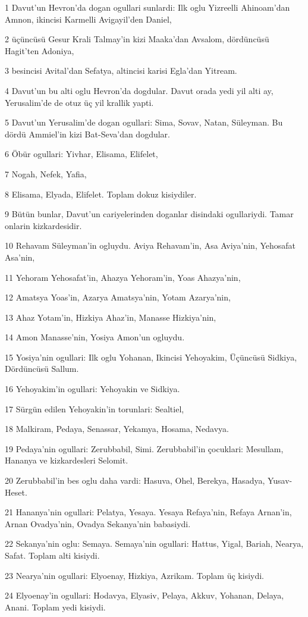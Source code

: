 \par 1 Davut'un Hevron'da dogan ogullari sunlardi: Ilk oglu Yizreelli Ahinoam'dan Amnon, ikincisi Karmelli Avigayil'den Daniel,
\par 2 üçüncüsü Gesur Krali Talmay'in kizi Maaka'dan Avsalom, dördüncüsü Hagit'ten Adoniya,
\par 3 besincisi Avital'dan Sefatya, altincisi karisi Egla'dan Yitream.
\par 4 Davut'un bu alti oglu Hevron'da dogdular. Davut orada yedi yil alti ay, Yerusalim'de de otuz üç yil krallik yapti.
\par 5 Davut'un Yerusalim'de dogan ogullari: Sima, Sovav, Natan, Süleyman. Bu dördü Ammiel'in kizi Bat-Seva'dan dogdular.
\par 6 Öbür ogullari: Yivhar, Elisama, Elifelet,
\par 7 Nogah, Nefek, Yafia,
\par 8 Elisama, Elyada, Elifelet. Toplam dokuz kisiydiler.
\par 9 Bütün bunlar, Davut'un cariyelerinden doganlar disindaki ogullariydi. Tamar onlarin kizkardesidir.
\par 10 Rehavam Süleyman'in ogluydu. Aviya Rehavam'in, Asa Aviya'nin, Yehosafat Asa'nin,
\par 11 Yehoram Yehosafat'in, Ahazya Yehoram'in, Yoas Ahazya'nin,
\par 12 Amatsya Yoas'in, Azarya Amatsya'nin, Yotam Azarya'nin,
\par 13 Ahaz Yotam'in, Hizkiya Ahaz'in, Manasse Hizkiya'nin,
\par 14 Amon Manasse'nin, Yosiya Amon'un ogluydu.
\par 15 Yosiya'nin ogullari: Ilk oglu Yohanan, Ikincisi Yehoyakim, Üçüncüsü Sidkiya, Dördüncüsü Sallum.
\par 16 Yehoyakim'in ogullari: Yehoyakin ve Sidkiya.
\par 17 Sürgün edilen Yehoyakin'in torunlari: Sealtiel,
\par 18 Malkiram, Pedaya, Senassar, Yekamya, Hosama, Nedavya.
\par 19 Pedaya'nin ogullari: Zerubbabil, Simi. Zerubbabil'in çocuklari: Mesullam, Hananya ve kizkardesleri Selomit.
\par 20 Zerubbabil'in bes oglu daha vardi: Hasuva, Ohel, Berekya, Hasadya, Yusav-Heset.
\par 21 Hananya'nin ogullari: Pelatya, Yesaya. Yesaya Refaya'nin, Refaya Arnan'in, Arnan Ovadya'nin, Ovadya Sekanya'nin babasiydi.
\par 22 Sekanya'nin oglu: Semaya. Semaya'nin ogullari: Hattus, Yigal, Bariah, Nearya, Safat. Toplam alti kisiydi.
\par 23 Nearya'nin ogullari: Elyoenay, Hizkiya, Azrikam. Toplam üç kisiydi.
\par 24 Elyoenay'in ogullari: Hodavya, Elyasiv, Pelaya, Akkuv, Yohanan, Delaya, Anani. Toplam yedi kisiydi.

